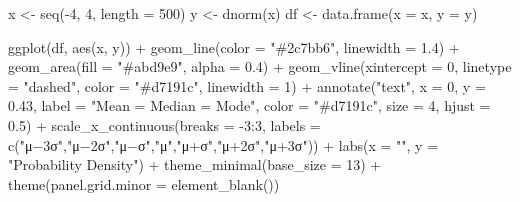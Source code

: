 \documentclass[
  12pt,
  letterpaper,
]{book}
\newenvironment{Shaded}{\begin{snugshade}}{\end{snugshade}}
\newcommand{\AttributeTok}[1]{\textcolor[rgb]{0.40,0.45,0.13}{#1}}
\newcommand{\DecValTok}[1]{\textcolor[rgb]{0.68,0.00,0.00}{#1}}
\newcommand{\FloatTok}[1]{\textcolor[rgb]{0.68,0.00,0.00}{#1}}
\newcommand{\FunctionTok}[1]{\textcolor[rgb]{0.28,0.35,0.67}{#1}}
\newcommand{\NormalTok}[1]{\textcolor[rgb]{0.00,0.23,0.31}{#1}}
\newcommand{\OtherTok}[1]{\textcolor[rgb]{0.00,0.23,0.31}{#1}}
\newcommand{\SpecialCharTok}[1]{\textcolor[rgb]{0.37,0.37,0.37}{#1}}
\newcommand{\StringTok}[1]{\textcolor[rgb]{0.13,0.47,0.30}{#1}}
\begin{document}
\begin{Shaded}
\begin{Highlighting}[]
\NormalTok{x }\OtherTok{\textless{}{-}} \FunctionTok{seq}\NormalTok{(}\SpecialCharTok{{-}}\DecValTok{4}\NormalTok{, }\DecValTok{4}\NormalTok{, }\AttributeTok{length =} \DecValTok{500}\NormalTok{)}
\NormalTok{y }\OtherTok{\textless{}{-}} \FunctionTok{dnorm}\NormalTok{(x)}
\NormalTok{df }\OtherTok{\textless{}{-}} \FunctionTok{data.frame}\NormalTok{(}\AttributeTok{x =}\NormalTok{ x, }\AttributeTok{y =}\NormalTok{ y)}

\FunctionTok{ggplot}\NormalTok{(df, }\FunctionTok{aes}\NormalTok{(x, y)) }\SpecialCharTok{+}
  \FunctionTok{geom\_line}\NormalTok{(}\AttributeTok{color =} \StringTok{"\#2c7bb6"}\NormalTok{, }\AttributeTok{linewidth =} \FloatTok{1.4}\NormalTok{) }\SpecialCharTok{+}
  \FunctionTok{geom\_area}\NormalTok{(}\AttributeTok{fill =} \StringTok{"\#abd9e9"}\NormalTok{, }\AttributeTok{alpha =} \FloatTok{0.4}\NormalTok{) }\SpecialCharTok{+}
  \FunctionTok{geom\_vline}\NormalTok{(}\AttributeTok{xintercept =} \DecValTok{0}\NormalTok{, }\AttributeTok{linetype =} \StringTok{"dashed"}\NormalTok{, }\AttributeTok{color =} \StringTok{"\#d7191c"}\NormalTok{, }\AttributeTok{linewidth =} \DecValTok{1}\NormalTok{) }\SpecialCharTok{+}
  \FunctionTok{annotate}\NormalTok{(}\StringTok{"text"}\NormalTok{, }\AttributeTok{x =} \DecValTok{0}\NormalTok{, }\AttributeTok{y =} \FloatTok{0.43}\NormalTok{, }\AttributeTok{label =} \StringTok{"Mean = Median = Mode"}\NormalTok{,}
           \AttributeTok{color =} \StringTok{"\#d7191c"}\NormalTok{, }\AttributeTok{size =} \DecValTok{4}\NormalTok{, }\AttributeTok{hjust =} \FloatTok{0.5}\NormalTok{) }\SpecialCharTok{+}
  \FunctionTok{scale\_x\_continuous}\NormalTok{(}\AttributeTok{breaks =} \SpecialCharTok{{-}}\DecValTok{3}\SpecialCharTok{:}\DecValTok{3}\NormalTok{,}
                     \AttributeTok{labels =} \FunctionTok{c}\NormalTok{(}\StringTok{"μ−3σ"}\NormalTok{,}\StringTok{"μ−2σ"}\NormalTok{,}\StringTok{"μ−σ"}\NormalTok{,}\StringTok{"μ"}\NormalTok{,}\StringTok{"μ+σ"}\NormalTok{,}\StringTok{"μ+2σ"}\NormalTok{,}\StringTok{"μ+3σ"}\NormalTok{)) }\SpecialCharTok{+}
  \FunctionTok{labs}\NormalTok{(}\AttributeTok{x =} \StringTok{""}\NormalTok{, }\AttributeTok{y =} \StringTok{"Probability Density"}\NormalTok{) }\SpecialCharTok{+}
  \FunctionTok{theme\_minimal}\NormalTok{(}\AttributeTok{base\_size =} \DecValTok{13}\NormalTok{) }\SpecialCharTok{+}
  \FunctionTok{theme}\NormalTok{(}\AttributeTok{panel.grid.minor =} \FunctionTok{element\_blank}\NormalTok{())}
\end{Highlighting}
\end{Shaded}
\end{document}
